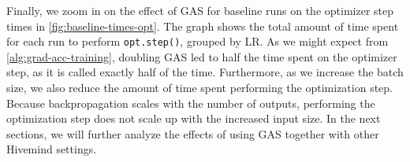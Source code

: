 Finally, we zoom in on the effect of GAS for baseline runs on the optimizer step times in \autoref{fig:baseline-times-opt}.
The graph shows the total amount of time spent for each run to perform \texttt{opt.step()}, grouped by LR.
As we might expect from \autoref{alg:grad-acc-training}, doubling GAS led to half the time spent on the optimizer step, as it is called exactly half of the time.
Furthermore, as we increase the batch size, we also reduce the amount of time spent performing the optimization step.
Because backpropagation scales with the number of outputs, performing the optimization step does not scale up with the increased input size.
In the next sections, we will further analyze the effects of using GAS together with other Hivemind settings.








